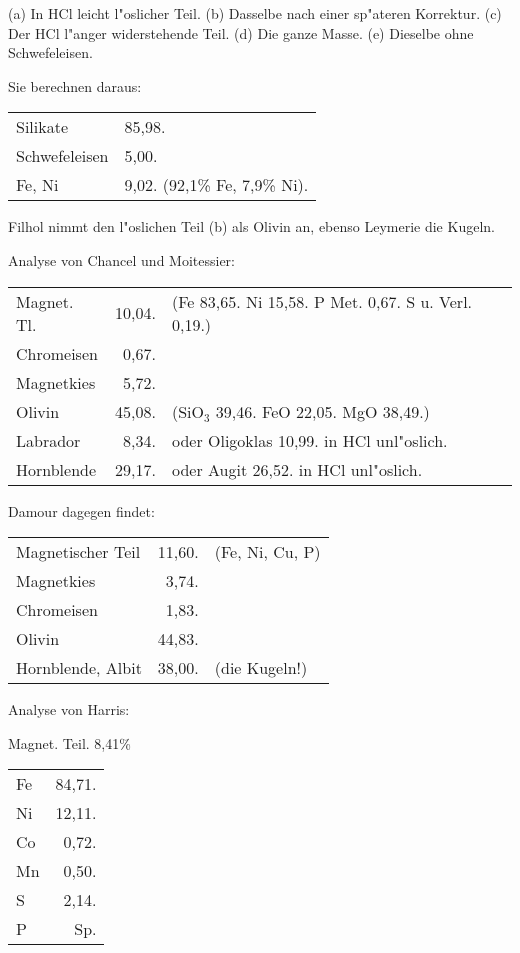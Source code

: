 \documentclass[a4paper, 11pt, oneside]{article}
\begin{document}
(a) In HCl leicht l"oslicher Teil. (b) Dasselbe nach einer sp"ateren Korrektur. (c) Der HCl l"anger widerstehende Teil. (d) Die ganze Masse. (e) Dieselbe ohne Schwefeleisen.

Sie berechnen daraus:
\begin{table}[H]
    \centering\swabfamily\Large
    \begin{tabular}{l l}
        Silikate & 85,98. \\
        Schwefeleisen & 5,00. \\
        Fe, Ni & 9,02. (92,1\% Fe, 7,9\% Ni). \\
    \end{tabular}
\end{table}

Filhol nimmt den l"oslichen Teil (b) als Olivin an, ebenso Leymerie die Kugeln.

Analyse von Chancel und Moitessier:
\begin{table}[H]
    \centering\swabfamily\Large
    \begin{tabular}{l r l}
        Magnet. Tl. & 10,04. & (Fe 83,65. Ni 15,58. P Met. 0,67. S u. Verl. 0,19.) \\
        Chromeisen & 0,67. & \\
        Magnetkies & 5,72. & \\
        Olivin & 45,08. & (SiO$_{3}$ 39,46. FeO 22,05. MgO 38,49.) \\
        Labrador & 8,34. & oder Oligoklas 10,99. in HCl unl"oslich. \\
        Hornblende & 29,17. & oder Augit 26,52. in HCl unl"oslich. \\
    \end{tabular}
\end{table}

Damour dagegen findet:
\begin{table}[H]
    \centering\swabfamily\Large
    \begin{tabular}{l r l}
        Magnetischer Teil & 11,60. & (Fe, Ni, Cu, P)  \\
        Magnetkies & 3,74. & \\
        Chromeisen & 1,83. & \\
        Olivin & 44,83. & \\
        Hornblende, Albit & 38,00. & (die Kugeln!) \\
    \end{tabular}
\end{table}

Analyse von Harris:
\begin{center}
Magnet. Teil. 8,41\%
\end{center}
\begin{table}[H]
    \centering\swabfamily\Large
    \begin{tabular}{l r}
        Fe & 84,71. \\
        Ni & 12,11. \\
        Co & 0,72. \\
        Mn & 0,50. \\
        S & 2,14. \\
        P & Sp. \\
    \end{tabular}
\end{table}
\end{document}
